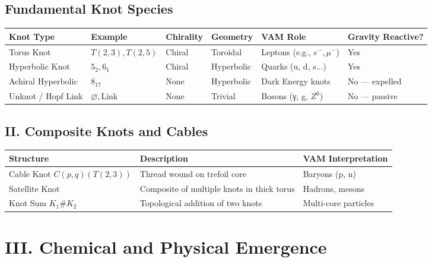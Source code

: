 \documentclass[12pt]{article}
\begin{document}
\subsection*{Fundamental Knot Species}
\begin{center}
    \footnotesize
    \begin{tabular}{|l|l|l|l|l|l|}
        \hline
        \textbf{Knot Type} & \textbf{Example} & \textbf{Chirality} & \textbf{Geometry} & \textbf{VAM Role} & \textbf{Gravity Reactive?} \\
        \hline
        Torus Knot & \( T(2,3), T(2,5) \) & Chiral & Toroidal & Leptons (e.g., \( e^-, \mu^- \)) & Yes \\
        Hyperbolic Knot & \( 5_2, 6_1 \) & Chiral & Hyperbolic & Quarks (u, d, s...) & Yes \\
        Achiral Hyperbolic & \( 8_{17} \) & None & Hyperbolic & Dark Energy knots & No — expelled \\
        Unknot / Hopf Link & \( \varnothing, \text{Link} \) & None & Trivial & Bosons (γ, g, \( Z^0 \)) & No — passive \\
        \hline
    \end{tabular}
\end{center}

\subsection*{II. Composite Knots and Cables}
\begin{center}
    \footnotesize
    \begin{tabular}{|l|p{8cm}|l|}
        \hline
        \textbf{Structure} & \textbf{Description} & \textbf{VAM Interpretation} \\
        \hline
        Cable Knot \( C(p,q)(T(2,3)) \) & Thread wound on trefoil core & Baryons (p, n) \\
        Satellite Knot & Composite of multiple knots in thick torus & Hadrons, mesons \\
        Knot Sum \( K_1 \# K_2 \) & Topological addition of two knots & Multi-core particles \\
        \hline
    \end{tabular}
\end{center}

\section*{III. Chemical and Physical Emergence}
\end{document}
